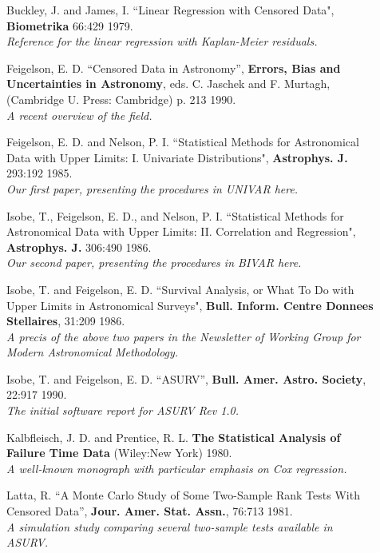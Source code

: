\begin{description}
\item [] Buckley, J. and James, I. ``Linear Regression with Censored Data", 
    {\bf Biometrika} 66:429 1979.\\
    {\it Reference for the linear regression with Kaplan-Meier residuals.}

\item [] Feigelson, E. D. ``Censored Data in Astronomy'', {\bf Errors,
    Bias and Uncertainties in Astronomy}, eds. C. Jaschek and F. Murtagh,
    (Cambridge U. Press: Cambridge) p. 213 1990.\\
    {\it A recent overview of the field.}

\item [] Feigelson, E. D. and Nelson, P. I. ``Statistical Methods for 
    Astronomical Data with Upper Limits: I. Univariate Distributions", 
    {\bf Astrophys. J.} 293:192 1985.\\
    {\it Our first paper, presenting the procedures in UNIVAR here.}

\item [] Isobe, T., Feigelson, E. D., and Nelson, P. I. ``Statistical Methods 
    for Astronomical Data with Upper Limits: II. Correlation and Regression",
    {\bf Astrophys. J.} 306:490 1986.\\
    {\it Our second paper, presenting the procedures in BIVAR here.}

\item [] Isobe, T. and Feigelson, E. D. ``Survival Analysis, or What To Do with
    Upper Limits in Astronomical Surveys", {\bf Bull. Inform. Centre Donnees
    Stellaires}, 31:209 1986.\\
    {\it A precis of the above two papers in the Newsletter of Working Group 
    for Modern Astronomical Methodology.}

\item [] Isobe, T. and Feigelson, E. D. ``ASURV'', {\bf Bull. Amer. Astro.
    Society}, 22:917 1990.\\
    {\it The initial software report for ASURV Rev 1.0.}

\item [] Kalbfleisch, J. D. and Prentice, R. L. {\bf The Statistical Analysis 
    of Failure Time Data} (Wiley:New York) 1980.\\
    {\it A well-known monograph with particular emphasis on Cox regression.}

\item [] Latta, R. ``A Monte Carlo Study of Some Two-Sample Rank Tests With
    Censored Data'', {\bf Jour. Amer. Stat. Assn.}, 76:713 1981. \\
    {\it A simulation study comparing several two-sample tests available in
    ASURV.}


\end{description}
